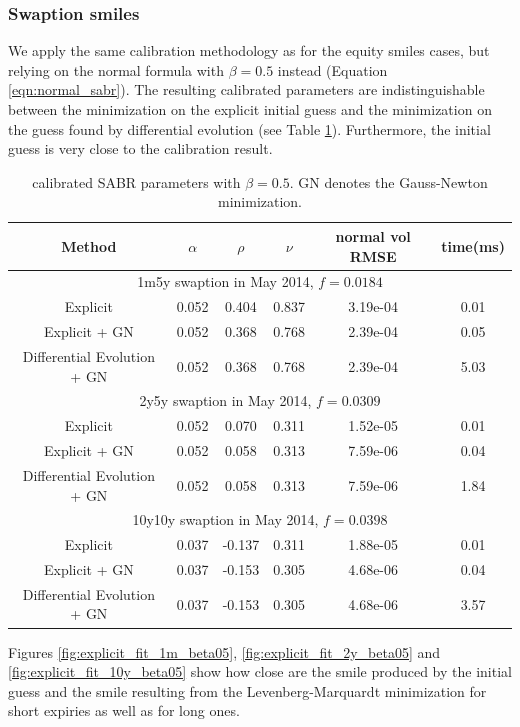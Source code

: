 \documentclass[]{rAMF2e}
\begin{document}
\subsubsection{Swaption smiles}
We apply the same calibration methodology as for the equity smiles cases, but relying on the normal formula with $\beta=0.5$ instead (Equation \ref{eqn:normal_sabr}). The resulting calibrated parameters are indistinguishable between the minimization on the explicit initial guess and the minimization on the guess found by differential evolution (see Table \ref{tbl:normal_sabr_fit}). Furthermore, the initial guess is very close to the calibration result. 

\begin{table}[h]
\begin{center}
\caption{\label{tbl:normal_sabr_fit}calibrated SABR parameters with $\beta=0.5$. GN denotes the Gauss-Newton minimization.}
\begin{tabular}{c c c c c c}
\hline
Method & $\alpha$ & $\rho$ &$\nu$ & normal vol RMSE & time(ms) \\
\hline
\multicolumn{6}{c}{1m5y swaption in May 2014, $f=0.0184$}\\
\hline
Explicit & 0.052 & 0.404 & 0.837 & 3.19e-04 & 0.01 \\
Explicit + GN  & 0.052 & 0.368 & 0.768 & 2.39e-04 & 0.05\\
Differential Evolution + GN  & 0.052 & 0.368 & 0.768 & 2.39e-04 & 5.03\\
\hline
\multicolumn{6}{c}{2y5y swaption in May 2014, $f=0.0309$}\\
\hline
Explicit & 0.052 & 0.070 & 0.311 & 1.52e-05 & 0.01 \\
Explicit + GN & 0.052 & 0.058 & 0.313 & 7.59e-06 & 0.04\\
Differential Evolution + GN & 0.052 & 0.058 & 0.313 & 7.59e-06 & 1.84\\
\hline
\multicolumn{6}{c}{10y10y swaption in May 2014, $f=0.0398$}\\
\hline
Explicit & 0.037 & -0.137 & 0.311 & 1.88e-05 & 0.01 \\
Explicit + GN  & 0.037 & -0.153 & 0.305 & 4.68e-06 & 0.04\\
Differential Evolution + GN  & 0.037 & -0.153 & 0.305 & 4.68e-06 & 3.57\\
\hline
\end{tabular}
\end{center}
\end{table}
Figures \ref{fig:explicit_fit_1m_beta05}, \ref{fig:explicit_fit_2y_beta05} and \ref{fig:explicit_fit_10y_beta05} show how close are the smile produced by the initial guess and the smile resulting from the Levenberg-Marquardt minimization for short expiries as well as for long ones.
\end{document}
